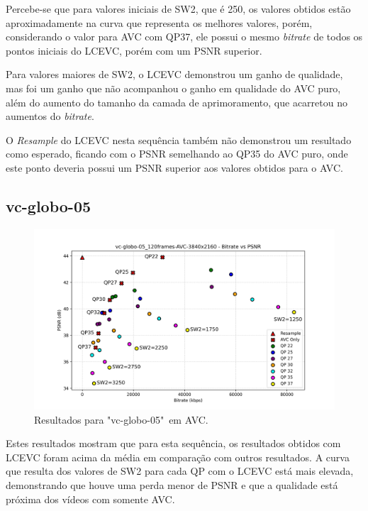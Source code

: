 Percebe-se que para valores iniciais de SW2, que é 250, os valores
obtidos estão aproximadamente na curva que representa os melhores valores, porém, considerando
o valor para \acrshort{AVC} com QP37, ele possui o mesmo \textit{bitrate} de todos os pontos
iniciais do \acrshort{LCEVC}, porém com um \acrshort{PSNR} superior.

Para valores maiores de SW2, o \acrshort{LCEVC} demonstrou um ganho de qualidade, mas foi
um ganho que não acompanhou o ganho em qualidade do \acrshort{AVC} puro, além do aumento
do tamanho da camada de aprimoramento, que acarretou no aumentos do \textit{bitrate}.

O \textit{Resample} do \acrshort{LCEVC} nesta sequência também não demonstrou um resultado
como esperado, ficando com o \acrshort{PSNR} semelhando ao QP35 do \acrshort{AVC} puro,
onde este ponto deveria possui um \acrshort{PSNR} superior aos valores obtidos para o \acrshort{AVC}.

\newpage
\subsection{vc-globo-05}

\begin{figure}[h]
    \centering
    \includegraphics[width=1.0\textwidth]{img/vc-globo-05_120frames-AVC.png}
    \caption{Resultados para "vc-globo-05"\ em \acrshort{AVC}.}
    \label{fig:vc-globo-05}
\end{figure}

Estes resultados mostram que para esta sequência, os resultados obtidos com \acrshort{LCEVC}
foram acima da média em comparação com outros resultados. A curva que resulta dos valores
de SW2 para cada QP com o \acrshort{LCEVC} está mais elevada, demonstrando que houve uma perda
menor de \acrshort{PSNR} e que a qualidade está próxima dos vídeos com somente \acrshort{AVC}.

